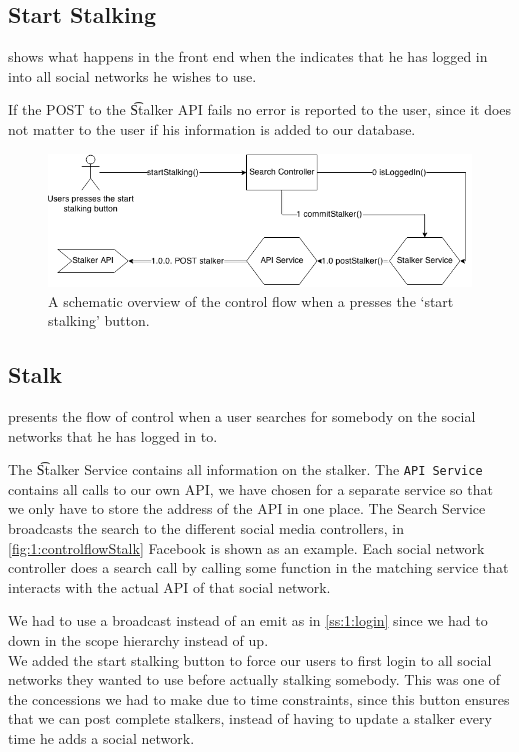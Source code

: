 \subsection{Start Stalking}
\label{ss:1:startStalking}
	 shows what happens in the front end when the indicates that he has logged in into all social networks he wishes to use. 
	
	If the POST to the \t{Stalker API} fails no error is reported to the user, since it does not matter to the user if his information is added to our database. 

		\begin{figure}
			\includegraphics[width=\textwidth]{./img/1_start_stalking_flow}
			\caption{A schematic overview of the control flow when a presses the `start stalking' button.}
			\label{fig:1:controlflowStartStalk}
		\end{figure}


\subsection{Stalk}
	 presents the flow of control when a user searches for somebody on the social networks that he has logged in to.

	The \t{Stalker Service} contains all information on the stalker. The \texttt{API Service} contains all calls to our own API, we have chosen for a separate service so that we only have to store the address of the API in one place. The Search Service broadcasts the search to the different social media controllers, in \cref{fig:1:controlflowStalk} Facebook is shown as an example. Each social network controller does a search call by calling some function in the matching service that interacts with the actual API of that social network.


	We had to use a broadcast instead of an emit as in \cref{ss:1:login} since we had to down in the scope hierarchy instead of up. \\

	We added the start stalking button to force our users to first login to all social networks they wanted to use before actually stalking somebody. This was one of the concessions we had to make due to time constraints, since this button ensures that we can post complete stalkers, instead of having to update a stalker every time he adds a social network. 

